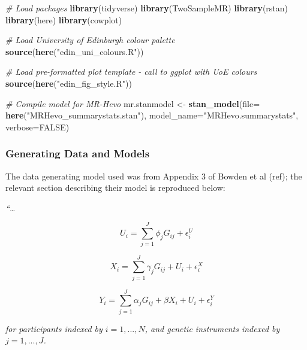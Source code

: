 \documentclass[
]{article}
\newenvironment{Shaded}{\begin{snugshade}}{\end{snugshade}}
\newcommand{\AttributeTok}[1]{\textcolor[rgb]{0.13,0.29,0.53}{#1}}
\newcommand{\CommentTok}[1]{\textcolor[rgb]{0.56,0.35,0.01}{\textit{#1}}}
\newcommand{\ConstantTok}[1]{\textcolor[rgb]{0.56,0.35,0.01}{#1}}
\newcommand{\FunctionTok}[1]{\textcolor[rgb]{0.13,0.29,0.53}{\textbf{#1}}}
\newcommand{\NormalTok}[1]{#1}
\newcommand{\OtherTok}[1]{\textcolor[rgb]{0.56,0.35,0.01}{#1}}
\newcommand{\StringTok}[1]{\textcolor[rgb]{0.31,0.60,0.02}{#1}}
\begin{document}
\begin{Shaded}
\begin{Highlighting}[]
\CommentTok{\# Load packages}
 \FunctionTok{library}\NormalTok{(tidyverse)}
 \FunctionTok{library}\NormalTok{(TwoSampleMR)}
 \FunctionTok{library}\NormalTok{(rstan)}
 \FunctionTok{library}\NormalTok{(here)}
 \FunctionTok{library}\NormalTok{(cowplot)}

\CommentTok{\# Load University of Edinburgh colour palette}
 \FunctionTok{source}\NormalTok{(}\FunctionTok{here}\NormalTok{(}\StringTok{"edin\_uni\_colours.R"}\NormalTok{))}

\CommentTok{\# Load pre{-}formatted plot template {-} call to ggplot with UoE colours}
 \FunctionTok{source}\NormalTok{(}\FunctionTok{here}\NormalTok{(}\StringTok{"edin\_fig\_style.R"}\NormalTok{))}

\CommentTok{\# Compile model for MR{-}Hevo}
\NormalTok{ mr.stanmodel }\OtherTok{\textless{}{-}} \FunctionTok{stan\_model}\NormalTok{(}\AttributeTok{file=} \FunctionTok{here}\NormalTok{(}\StringTok{"MRHevo\_summarystats.stan"}\NormalTok{),}
                                   \AttributeTok{model\_name=}\StringTok{"MRHevo.summarystats"}\NormalTok{, }\AttributeTok{verbose=}\ConstantTok{FALSE}\NormalTok{)}
\end{Highlighting}
\end{Shaded}

\subsubsection{Generating Data and Models}\label{generating-data-and-models}

The data generating model used was from Appendix 3 of Bowden et al (ref); the relevant section describing their model is reproduced below:

\emph{``\ldots{}}

\begin{equation}
 U_i = \sum^J_{j=1} \phi_jG_{ij} + \epsilon_i^U
 \end{equation}

\begin{equation}
 X_i = \sum^J_{j=1} \gamma_jG_{ij} + U_i + \epsilon_i^X
 \end{equation}

\begin{equation}
 Y_i = \sum^J_{j=1} \alpha_jG_{ij} + \beta X_i + U_i + \epsilon_i^Y
 \end{equation}

\emph{for participants indexed by \(i = 1, . . . , N\), and genetic instruments indexed by \(j = 1, . . . , J\).}
\end{document}
